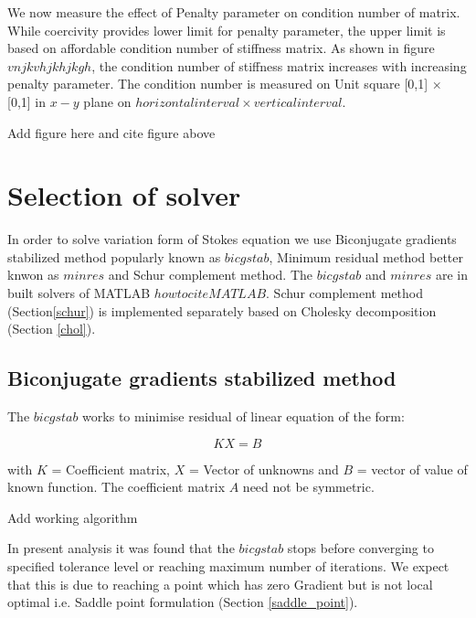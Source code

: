 \documentclass[a4paper,12pt]{book}
\begin{document}
We now measure the effect of Penalty parameter on condition number of matrix. While coercivity provides lower limit for penalty parameter, the upper limit is based on affordable condition number of stiffness matrix. As shown in figure $vnjkvhjkhjkgh$, the condition number of stiffness matrix increases with increasing penalty parameter.
The condition number is measured on Unit square [0,1] $\times$ [0,1] in $x-y$ plane on $horizontal interval \times vertical interval$.

\begin{Huge}
Add figure here and cite figure above
\end{Huge}

\section{Selection of solver}

In order to solve variation form of Stokes equation we use Biconjugate gradients stabilized method popularly known as $bicgstab$, Minimum residual method better knwon as $minres$ and Schur complement method. The $bicgstab$ and $minres$ are in built solvers of MATLAB $howtociteMATLAB$. Schur complement method (Section\ref{schur}) is implemented separately based on Cholesky decomposition (Section \ref{chol}).

\subsection{Biconjugate gradients stabilized method}

The $bicgstab$ works to minimise residual of linear equation of the form:

\begin{equation} \label{linear_matrix_equation}
KX = B
\end{equation}

with $K$ = Coefficient matrix, $X$ = Vector of unknowns and $B$ = vector of value of known function. The coefficient matrix $A$ need not be symmetric. 

\begin{Huge}
Add working algorithm
\end{Huge}

In present analysis it was found that the $bicgstab$ stops before converging to specified tolerance level or reaching maximum number of iterations. We expect that this is due to reaching a point which has zero Gradient but is not local optimal i.e. Saddle point formulation (Section \ref{saddle_point}). 
\end{document}

